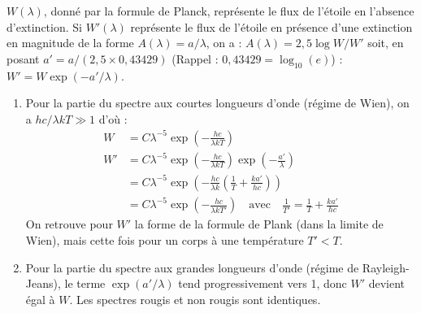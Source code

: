 \documentclass[a4paper,10pt]{report}
\begin{document}
\begin{Answer}
  $W(\lambda)$, donné par la formule de Planck, représente le flux de
  l'étoile en l'absence d'extinction.  Si $W'(\lambda)$ représente le
  flux de l'étoile en présence d'une extinction en magnitude de la
  forme $A(\lambda) = a/\lambda$, on a : $A(\lambda)= 2,5 \log W/W'$
  soit, en posant $a' = a/(2,5 \times 0,43429)$ (Rappel : $0,43429 =
  \log_{10}(e)$) : $W' = W \exp(-a'/\lambda)$.

  \begin{enumerate}
  \item Pour la partie du spectre aux courtes longueurs d'onde (régime
    de Wien), on a $hc/\lambda kT \gg 1$ d'où :
    \begin{align*}
      W  &= C\lambda^{-5}\exp\left(-\frac{hc}{\lambda kT}\right) \\
      W' &= C\lambda^{-5}\exp\left(-\frac{hc}{\lambda kT}\right)
      \exp\left(-\frac{a'}{\lambda}\right) \\
      &= C\lambda^{-5}\exp\left(-\frac{hc}{\lambda k}
        \left(\frac{1}{T}+\frac{ka'}{hc}\right)\right) \\
      &= C\lambda^{-5}\exp\left(-\frac{hc}{\lambda kT'}\right)
      \quad\text{avec}\quad
      \frac{1}{T'} = \frac{1}{T} + \frac{ka'}{hc}
    \end{align*}
    On retrouve pour $W'$ la forme de la formule de Plank (dans la
    limite de Wien), mais cette fois pour un corps à une température
    $T' < T$.

  \item Pour la partie du spectre aux grandes longueurs d'onde (régime
    de Rayleigh-Jeans), le terme $\exp(a'/\lambda)$ tend
    progressivement vers 1, donc $W'$ devient égal à $W$. Les spectres
    rougis et non rougis sont identiques.
  \end{enumerate}
\end{Answer}
\end{document}
